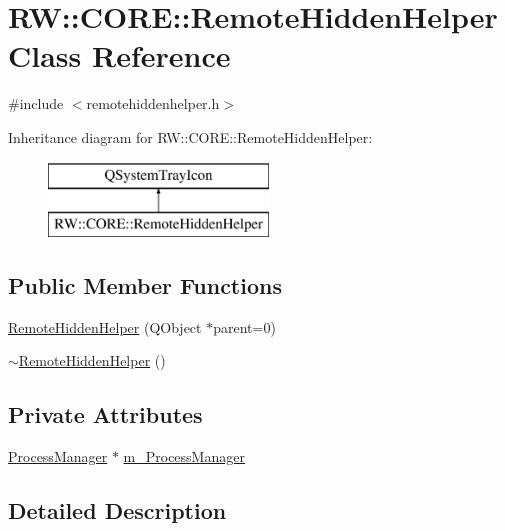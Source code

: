 \hypertarget{class_r_w_1_1_c_o_r_e_1_1_remote_hidden_helper}{}\section{RW\+:\+:C\+O\+RE\+:\+:Remote\+Hidden\+Helper Class Reference}
\label{class_r_w_1_1_c_o_r_e_1_1_remote_hidden_helper}


{\ttfamily \#include $<$remotehiddenhelper.\+h$>$}

Inheritance diagram for RW\+:\+:C\+O\+RE\+:\+:Remote\+Hidden\+Helper\+:\begin{figure}[H]
\begin{center}
\leavevmode
\includegraphics[height=2.000000cm]{class_r_w_1_1_c_o_r_e_1_1_remote_hidden_helper}
\end{center}
\end{figure}
\subsection*{Public Member Functions}
\begin{DoxyCompactItemize}
\item 
\hyperlink{class_r_w_1_1_c_o_r_e_1_1_remote_hidden_helper_a605994a170cd9a99b270159662d14d97}{Remote\+Hidden\+Helper} (Q\+Object $\ast$parent=0)
\item 
\hyperlink{class_r_w_1_1_c_o_r_e_1_1_remote_hidden_helper_ac7e3c2bbb6a671aa2cd5cfb39b70f28e}{$\sim$\+Remote\+Hidden\+Helper} ()
\end{DoxyCompactItemize}
\subsection*{Private Attributes}
\begin{DoxyCompactItemize}
\item 
\hyperlink{class_r_w_1_1_c_o_r_e_1_1_process_manager}{Process\+Manager} $\ast$ \hyperlink{class_r_w_1_1_c_o_r_e_1_1_remote_hidden_helper_af8e698e8aaf6a6ff89f03691494c3165}{m\+\_\+\+Process\+Manager}
\end{DoxyCompactItemize}


\subsection{Detailed Description}


